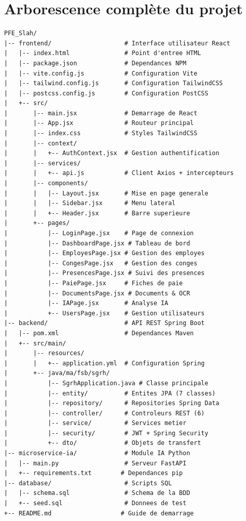\documentclass[a4paper,12pt]{report}
\begin{document}
\section{Arborescence complète du projet}

\begin{lstlisting}[language={},title={\textbf{Structure des dossiers}},morekeywords={frontend,backend,microservice-ia,database,documentation,src,main,java,ma,fsb,sgrh,components,context,pages,services,entity,repository,controller,security,service,dto,resources}]
PFE_Slah/
|-- frontend/                    # Interface utilisateur React
|   |-- index.html               # Point d'entree HTML
|   |-- package.json             # Dependances NPM
|   |-- vite.config.js           # Configuration Vite
|   |-- tailwind.config.js       # Configuration TailwindCSS
|   |-- postcss.config.js        # Configuration PostCSS
|   +-- src/
|       |-- main.jsx             # Demarrage de React
|       |-- App.jsx              # Routeur principal
|       |-- index.css            # Styles TailwindCSS
|       |-- context/
|       |   +-- AuthContext.jsx  # Gestion authentification
|       |-- services/
|       |   +-- api.js           # Client Axios + intercepteurs
|       |-- components/
|       |   |-- Layout.jsx       # Mise en page generale
|       |   |-- Sidebar.jsx      # Menu lateral
|       |   +-- Header.jsx       # Barre superieure
|       +-- pages/
|           |-- LoginPage.jsx    # Page de connexion
|           |-- DashboardPage.jsx # Tableau de bord
|           |-- EmployesPage.jsx # Gestion des employes
|           |-- CongesPage.jsx   # Gestion des conges
|           |-- PresencesPage.jsx # Suivi des presences
|           |-- PaiePage.jsx     # Fiches de paie
|           |-- DocumentsPage.jsx # Documents & OCR
|           |-- IAPage.jsx       # Analyse IA
|           +-- UsersPage.jsx    # Gestion utilisateurs
|-- backend/                     # API REST Spring Boot
|   |-- pom.xml                  # Dependances Maven
|   +-- src/main/
|       |-- resources/
|       |   +-- application.yml  # Configuration Spring
|       +-- java/ma/fsb/sgrh/
|           |-- SgrhApplication.java # Classe principale
|           |-- entity/          # Entites JPA (7 classes)
|           |-- repository/      # Repositories Spring Data
|           |-- controller/      # Controleurs REST (6)
|           |-- service/         # Services metier
|           |-- security/        # JWT + Spring Security
|           +-- dto/             # Objets de transfert
|-- microservice-ia/             # Module IA Python
|   |-- main.py                  # Serveur FastAPI
|   +-- requirements.txt        # Dependances pip
|-- database/                    # Scripts SQL
|   |-- schema.sql               # Schema de la BDD
|   +-- seed.sql                 # Donnees de test
+-- README.md                   # Guide de demarrage
\end{lstlisting}
\end{document}
